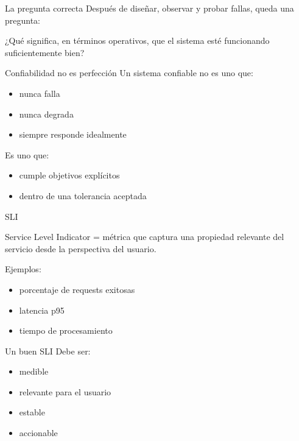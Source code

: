 \documentclass[institutional,screen,none]{ua-engineering-v6-beamer}
\title{\UACourse}
\subtitle{Clase 13 --- SLI, SLO, SLA, error budgets y operación guiada por objetivos}
\author{\UAProfessor}
\date{\UADate}
\begin{document}
{
\begin{frame}[plain]
\titlepage
\end{frame}
}


\begin{frame}{La pregunta correcta}
Después de diseñar, observar y probar fallas, queda una pregunta:

\begin{block}{}
¿Qué significa, en términos operativos, que el sistema esté funcionando suficientemente bien?
\end{block}
\end{frame}

\begin{frame}{Confiabilidad no es perfección}
Un sistema confiable no es uno que:
\begin{itemize}
\item nunca falla
\item nunca degrada
\item siempre responde idealmente
\end{itemize}

\pause

Es uno que:
\begin{itemize}
\item cumple objetivos explícitos
\item dentro de una tolerancia aceptada
\end{itemize}
\end{frame}


\begin{frame}{SLI}
\begin{block}{}
Service Level Indicator = métrica que captura una propiedad relevante del servicio desde la perspectiva del usuario.
\end{block}

\pause

Ejemplos:
\begin{itemize}
\item porcentaje de requests exitosas
\item latencia p95
\item tiempo de procesamiento
\end{itemize}
\end{frame}

\begin{frame}{Un buen SLI}
Debe ser:
\begin{itemize}
\item medible
\item relevante para el usuario
\item estable
\item accionable
\end{itemize}
\end{frame}
\end{document}

